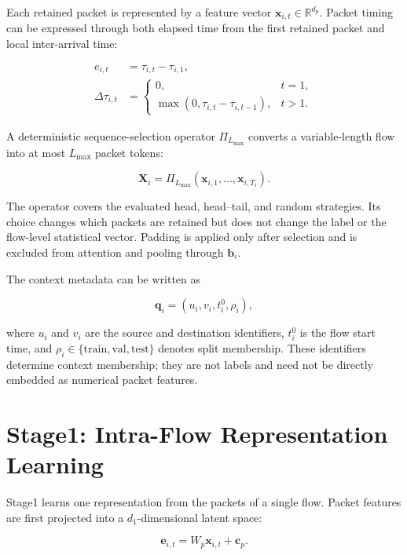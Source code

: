 \documentclass[11pt,fleqn]{report}
\begin{document}
Each retained packet is represented by a feature vector
$\mathbf{x}_{i,t}\in\mathbb{R}^{d_p}$. Packet timing can be expressed through
both elapsed time from the first retained packet and local inter-arrival time:

\begin{align}
e_{i,t} &= \tau_{i,t}-\tau_{i,1}, \\
\Delta\tau_{i,t} &=
\begin{cases}
0, & t=1,\\
\max(0,\tau_{i,t}-\tau_{i,t-1}), & t>1.
\end{cases}
\end{align}

A deterministic sequence-selection operator $\Pi_{L_{\max}}$ converts a
variable-length flow into at most $L_{\max}$ packet tokens:

\begin{equation}
\mathbf{X}_i=
\Pi_{L_{\max}}
\left(
    \mathbf{x}_{i,1},\ldots,\mathbf{x}_{i,T_i}
\right).
\end{equation}

The operator covers the evaluated head, head--tail, and random strategies. Its
choice changes which packets are retained but does not change the label or the
flow-level statistical vector. Padding is applied only after selection and is
excluded from attention and pooling through $\mathbf{b}_i$.

The context metadata can be written as

\begin{equation}
\mathbf{q}_i=(u_i,v_i,t_i^{0},\rho_i),
\end{equation}

where $u_i$ and $v_i$ are the source and destination identifiers, $t_i^{0}$ is
the flow start time, and $\rho_i\in\{\mathrm{train},\mathrm{val},\mathrm{test}\}$
denotes split membership. These identifiers determine context membership; they
are not labels and need not be directly embedded as numerical packet features.

\section{Stage1: Intra-Flow Representation Learning}
\label{subsec:stage1_formulation}

Stage1 learns one representation from the packets of a single flow. Packet
features are first projected into a $d_1$-dimensional latent space:

\begin{equation}
\mathbf{e}_{i,t}=W_p\mathbf{x}_{i,t}+\mathbf{c}_p.
\end{equation}
\end{document}
